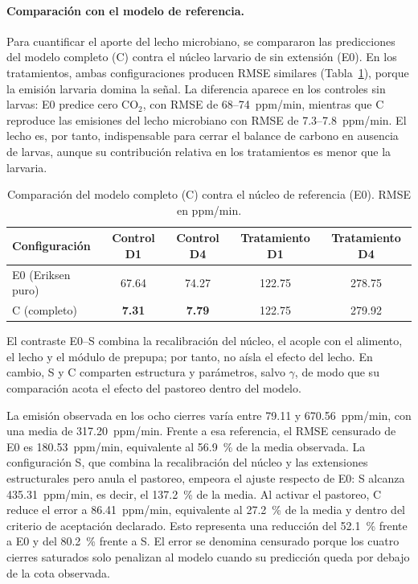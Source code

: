 \paragraph{Comparación con el modelo de referencia.}
Para cuantificar el aporte del lecho microbiano, se compararon las predicciones del modelo completo (C) contra el núcleo larvario de \textcite{eriksenDynamicModellingFeed2022} sin extensión (E0). En los tratamientos, ambas configuraciones producen RMSE similares (Tabla~\ref{tab:comparacion_E0_C}), porque la emisión larvaria domina la señal. La diferencia aparece en los controles sin larvas: E0 predice cero CO$_2$, con RMSE de 68--74~ppm/min, mientras que C reproduce las emisiones del lecho microbiano con RMSE de 7.3--7.8~ppm/min. El lecho es, por tanto, indispensable para cerrar el balance de carbono en ausencia de larvas, aunque su contribución relativa en los tratamientos es menor que la larvaria.

\begin{table}[htbp]
  \centering
  \small
  \caption{Comparación del modelo completo (C) contra el núcleo de referencia (E0). RMSE en ppm/min.}
  \label{tab:comparacion_E0_C}
  \begin{tabular}{lcccc}
    \toprule
    Configuración & Control D1 & Control D4 & Tratamiento D1 & Tratamiento D4 \\
    \midrule
    E0 (Eriksen puro) & 67.64 & 74.27 & 122.75 & 278.75 \\
    C (completo) & \textbf{7.31} & \textbf{7.79} & 122.75 & 279.92 \\
    \bottomrule
  \end{tabular}
\end{table}

El contraste E0--S combina la recalibración del núcleo, el acople con el alimento, el lecho y el módulo de prepupa; por tanto, no aísla el efecto del lecho. En cambio, S y C comparten estructura y parámetros, salvo $\gamma$, de modo que su comparación acota el efecto del pastoreo dentro del modelo.

La emisión observada en los ocho cierres varía entre 79.11 y 670.56~ppm/min, con una media de 317.20~ppm/min. Frente a esa referencia, el RMSE censurado de E0 es 180.53~ppm/min, equivalente al 56.9~\% de la media observada. La configuración S, que combina la recalibración del núcleo y las extensiones estructurales pero anula el pastoreo, empeora el ajuste respecto de E0: S alcanza 435.31~ppm/min, es decir, el 137.2~\% de la media. Al activar el pastoreo, C reduce el error a 86.41~ppm/min, equivalente al 27.2~\% de la media y dentro del criterio de aceptación declarado. Esto representa una reducción del 52.1~\% frente a E0 y del 80.2~\% frente a S. El error se denomina censurado porque los cuatro cierres saturados solo penalizan al modelo cuando su predicción queda por debajo de la cota observada.

